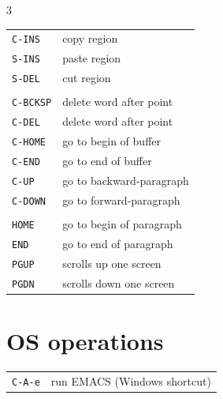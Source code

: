 \documentclass[11pt,landscape,a4paper]{article}
\begin{document}
\begin{multicols}{3}
\begin{tabular}{@{}ll@{}}
	\verb!C-INS! & copy region\\ 
	\verb!S-INS! & paste region\\ 
	\verb!S-DEL! & cut region\\ 
		\\
		\verb!C-BCKSP! & delete word after point\\ 
		\verb!C-DEL! & delete word after point\\ 
		\verb!C-HOME! & go to begin of buffer\\ 
		\verb!C-END! & go to end of buffer \\ 
		{\verb|C-UP|} 	& go to backward-paragraph\\
		{\verb|C-DOWN|} & go to forward-paragraph\\ 
		\\
		\verb!HOME! & go to begin of paragraph \\
		\verb!END! & go to end of paragraph \\
		\verb!PGUP! & scrolls up one screen\\
		\verb!PGDN! & scrolls down one screen\\
\end{tabular}

\section{OS operations}

\begin{tabular}{@{}ll@{}}
	\verb!C-A-e! & run EMACS (Windows shortcut)\\ 
\end{tabular}


\vspace{1em}



\vfill\null
\columnbreak


\end{multicols}
\end{document}
